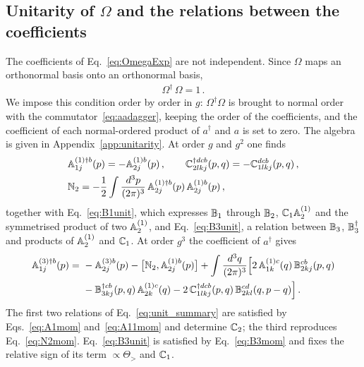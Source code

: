 \subsection{Unitarity of \texorpdfstring{$\Omega$}{Omega} and the relations between the coefficients}\label{sec:unitarity}

The coefficients of Eq.~\eqref{eq:OmegaExp} are not independent. Since $\Omega$ maps an orthonormal basis onto an orthonormal basis,
\begin{align}\label{eq:unit}
\Omega^\dagger\,\Omega=1\,.
\end{align}
We impose this condition order by order in $g$: $\Omega^\dagger\Omega$ is brought to normal order with the commutator~\eqref{eq:aadagger}, keeping the order of the coefficients, and the coefficient of each normal-ordered product of $a^\dagger$ and $a$ is set to zero. The algebra is given in Appendix~\ref{app:unitarity}. At order $g$ and $g^2$ one finds
\begin{align}\label{eq:unit_summary}
&\mathbb{A}^{(1)\dagger b}_{1j}(p)=-\mathbb{A}^{(1)b}_{2j}(p)\,,\qquad
\mathbb{C}^{\dagger dcb}_{2lkj}(p,q)=-\mathbb{C}^{dcb}_{1lkj}(p,q)\,,\notag\\
&\mathbb{N}_2=-\frac12\int\frac{d^3p}{(2\pi)^3}\,\mathbb{A}^{(1)\dagger b}_{2j}(p)\,\mathbb{A}^{(1)b}_{2j}(p)\,,
\end{align}
together with Eq.~\eqref{eq:B1unit}, which expresses $\mathbb{B}_1$ through $\mathbb{B}_2$, $\mathbb{C}_1\mathbb{A}^{(1)}_2$ and the symmetrised product of two $\mathbb{A}^{(1)}_2$, and Eq.~\eqref{eq:B3unit}, a relation between $\mathbb{B}_3$, $\mathbb{B}_3^\dagger$ and products of $\mathbb{A}^{(1)}_2$ and $\mathbb{C}_1$. At order $g^3$ the coefficient of $a^\dagger$ gives
\begin{align}\label{eq:A31unit}
\mathbb{A}^{(3)\dagger b}_{1j}(p)=\ &-\mathbb{A}^{(3)b}_{2j}(p)-\big[\mathbb{N}_2,\mathbb{A}^{(1)b}_{2j}(p)\big]
+\int\frac{d^3q}{(2\pi)^3}\Big[2\,\mathbb{A}^{(1)c}_{1k}(q)\,\mathbb{B}^{cb}_{2kj}(p,q)\notag\\
&-\mathbb{B}^{\dagger cb}_{3kj}(p,q)\,\mathbb{A}^{(1)c}_{2k}(q)
-2\,\mathbb{C}^{\dagger dcb}_{1lkj}(p,q)\,\mathbb{B}^{cd}_{2kl}(q,p-q)\Big]\,.
\end{align}
The first two relations of Eq.~\eqref{eq:unit_summary} are satisfied by Eqs.~\eqref{eq:A1mom} and~\eqref{eq:A11mom} and determine $\mathbb{C}_2$; the third reproduces Eq.~\eqref{eq:N2mom}. Eq.~\eqref{eq:B3unit} is satisfied by Eq.~\eqref{eq:B3mom} and fixes the relative sign of its term $\propto\Theta_>$ and $\mathbb{C}_1$.

